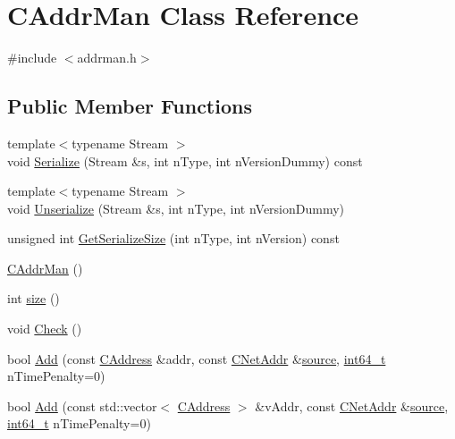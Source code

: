 \hypertarget{class_c_addr_man}{}\section{C\+Addr\+Man Class Reference}
\label{class_c_addr_man}


{\ttfamily \#include $<$addrman.\+h$>$}

\subsection*{Public Member Functions}
\begin{DoxyCompactItemize}
\item 
{\footnotesize template$<$typename Stream $>$ }\\void \hyperlink{class_c_addr_man_a88d4327f77fa70d9a88917897c3c6c97}{Serialize} (Stream \&s, int n\+Type, int n\+Version\+Dummy) const 
\item 
{\footnotesize template$<$typename Stream $>$ }\\void \hyperlink{class_c_addr_man_a68eaf1797ecb8bff380aa7f9fc452e14}{Unserialize} (Stream \&s, int n\+Type, int n\+Version\+Dummy)
\item 
unsigned int \hyperlink{class_c_addr_man_aa2266bea9d5336b0a93fe703a8601e55}{Get\+Serialize\+Size} (int n\+Type, int n\+Version) const 
\item 
\hyperlink{class_c_addr_man_ad9179d1c36c2ea3492e221576f340d33}{C\+Addr\+Man} ()
\item 
int \hyperlink{class_c_addr_man_a15b8e72f55344b6fbd1bc1bda3cdc5bc}{size} ()
\item 
void \hyperlink{class_c_addr_man_a0c2677ae50ce0d680f0105b285d1f5d0}{Check} ()
\item 
bool \hyperlink{class_c_addr_man_a03fcc7109b5f014760dc50a81f68c5ec}{Add} (const \hyperlink{class_c_address}{C\+Address} \&addr, const \hyperlink{class_c_net_addr}{C\+Net\+Addr} \&\hyperlink{debugconsole_8cpp_af2ed45b90afa2ef4ec6e09625335a082}{source}, \hyperlink{stdint_8h_adec1df1b8b51cb32b77e5b86fff46471}{int64\+\_\+t} n\+Time\+Penalty=0)
\item 
bool \hyperlink{class_c_addr_man_aa2ae2abdf710b2d81fa37f072bab028e}{Add} (const std\+::vector$<$ \hyperlink{class_c_address}{C\+Address} $>$ \&v\+Addr, const \hyperlink{class_c_net_addr}{C\+Net\+Addr} \&\hyperlink{debugconsole_8cpp_af2ed45b90afa2ef4ec6e09625335a082}{source}, \hyperlink{stdint_8h_adec1df1b8b51cb32b77e5b86fff46471}{int64\+\_\+t} n\+Time\+Penalty=0)
\item 

\end{DoxyCompactItemize}
